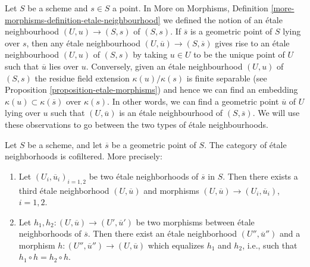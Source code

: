 \begin{remark}
\label{remark-etale-neighbourhoods}
Let $S$ be a scheme and $s \in S$ a point. In
More on Morphisms,
Definition \ref{more-morphisms-definition-etale-neighbourhood}
we defined the notion of an \'etale neighbourhood $(U, u) \to (S, s)$
of $(S, s)$. If $\overline{s}$ is a geometric point of $S$ lying over
$s$, then any \'etale neighbourhood $(U, \overline{u}) \to (S, \overline{s})$
gives rise to an \'etale neighbourhood $(U, u)$ of $(S, s)$ by taking
$u \in U$ to be the unique point of $U$ such that $\overline{u}$
lies over $u$. Conversely, given an \'etale neighbourhood $(U, u)$
of $(S, s)$ the residue field extension $\kappa(u)/\kappa(s)$
is finite separable (see
Proposition \ref{proposition-etale-morphisms})
and hence we can find an embedding $\kappa(u) \subset \kappa(\overline{s})$
over $\kappa(s)$. In other words, we can find a geometric point
$\overline{u}$ of $U$ lying over $u$ such that $(U, \overline{u})$
is an \'etale neighbourhood of $(S, \overline{s})$.
We will use these observations to go between the two types of
\'etale neighbourhoods.
\end{remark}

\begin{lemma}
\label{lemma-cofinal-etale}
Let $S$ be a scheme, and let $\overline{s}$ be a geometric point of $S$.
The category of \'etale neighborhoods is cofiltered. More precisely:
\begin{enumerate}
\item Let $(U_i, \overline{u}_i)_{i = 1, 2}$ be two \'etale neighborhoods of
$\overline{s}$ in $S$. Then there exists a third \'etale neighborhood
$(U, \overline{u})$ and morphisms
$(U, \overline{u}) \to (U_i, \overline{u}_i)$, $i = 1, 2$.
\item Let $h_1, h_2: (U, \overline{u}) \to (U', \overline{u}')$ be two
morphisms between \'etale neighborhoods of $\overline{s}$. Then there exist an
\'etale neighborhood $(U'', \overline{u}'')$ and a morphism
$h : (U'', \overline{u}'') \to (U, \overline{u})$
which equalizes $h_1$ and $h_2$, i.e., such that
$h_1 \circ h = h_2 \circ h$.
\end{enumerate}
\end{lemma}

